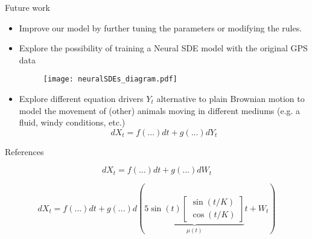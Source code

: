 \documentclass[
    aspectratio=169,
    10pt,
]{beamer}
\begin{document}
\begin{frame}{Future work}
    \begin{itemize}
        \pause
        \item Improve our model by further tuning the parameters or modifying the rules. 
        \pause
        \item Explore the possibility of training a Neural SDE model with the original GPS data 
        \begin{figure}
            \centering
            \texttt{[image: neuralSDEs\_diagram.pdf]}
        \end{figure}
        \pause
        \item Explore different equation drivers \(Y_t\) alternative to plain Brownian motion to model the movement of (other) animals moving in different mediums (e.g. a fluid, windy conditions, etc.)
        \[
            dX_t = f(...) dt + g(...) dY_t
        \]
    \end{itemize}
\end{frame}

\begin{frame}{References}

\nocite{*}
\printbibliography
    
\end{frame}


\begin{frame}
\Huge
\[  
    dX_t = f(...) dt + g(...) dW_t
\]
    
\end{frame}
\begin{frame}
\LARGE
\[  
    dX_t = f(...) dt + g(...) d\left(
        \underbrace{5\sin(t)\begin{bmatrix}
            \sin(t / K) \\
            \cos(t / K)
        \end{bmatrix}}_{\mu(t)} t + W_t
    \right)
\]
    
\end{frame}
\end{document}
